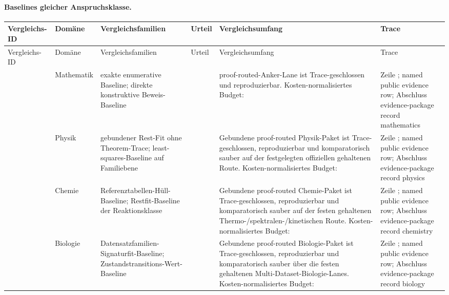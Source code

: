 \paragraph{Baselines gleicher Anspruchsklasse.}
\begingroup
\scriptsize
\setlength{\emergencystretch}{1.5em}
\setlength{\tabcolsep}{2pt}
\setlength{\LTleft}{0pt}
\setlength{\LTright}{0pt}
\begin{longtable}{@{}L{0.14\textwidth}L{0.09\textwidth}L{0.17\textwidth}L{0.10\textwidth}L{0.23\textwidth}L{0.18\textwidth}@{}}
\toprule
Vergleichs-ID & Domäne & Vergleichsfamilien & Urteil & Vergleichsumfang & Trace \\
\midrule
\endfirsthead
\toprule
Vergleichs-ID & Domäne & Vergleichsfamilien & Urteil & Vergleichsumfang & Trace \\
\midrule
\endhead
{} & Mathematik & exakte enumerative Baseline; direkte konstruktive Beweis-Baseline &  & proof-routed-Anker-Lane ist Trace-geschlossen und reproduzierbar. \allowbreak Kosten-normalisiertes Budget:  & Zeile ; named public evidence row; \allowbreak Abschluss evidence-package record mathematics \\
 & Physik & gebundener Rest-Fit ohne Theorem-Trace; least-squares-Baseline auf Familiebene &  & Gebundene proof-routed Physik-Paket ist Trace-geschlossen, reproduzierbar und komparatorisch sauber auf der festgelegten offiziellen gehaltenen Route. \allowbreak Kosten-normalisiertes Budget:  & Zeile ; named public evidence row; \allowbreak Abschluss evidence-package record physics \\
 & Chemie & Referenztabellen-Hüll-Baseline; Restfit-Baseline der Reaktionsklasse &  & Gebundene proof-routed Chemie-Paket ist Trace-geschlossen, reproduzierbar und komparatorisch sauber auf der festen gehaltenen Thermo-/spektralen-/kinetischen Route. \allowbreak Kosten-normalisiertes Budget:  & Zeile ; named public evidence row; \allowbreak Abschluss evidence-package record chemistry \\
 & Biologie & Datensatzfamilien-Signaturfit-Baseline; Zustandstransitions-Wert-Baseline &  & Gebundene proof-routed Biologie-Paket ist Trace-geschlossen, reproduzierbar und komparatorisch sauber über die festen gehaltenen Multi-Dataset-Biologie-Lanes. \allowbreak Kosten-normalisiertes Budget:  & Zeile ; named public evidence row; \allowbreak Abschluss evidence-package record biology \\

\end{longtable}
